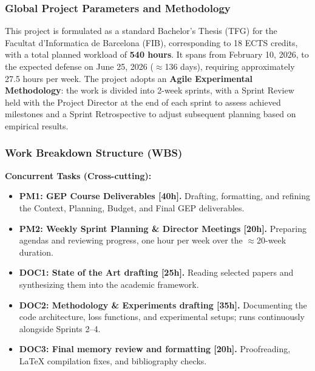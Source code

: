 \documentclass[11pt, a4paper]{article}
\begin{document}
\subsubsection*{Global Project Parameters and Methodology}
This project is formulated as a standard Bachelor's Thesis (TFG) for the Facultat d'Informatica de Barcelona (FIB), corresponding to 18 ECTS credits, with a total planned workload of \textbf{540 hours}. It spans from February 10, 2026, to the expected defense on June 25, 2026 ($\approx$136 days), requiring approximately 27.5 hours per week. The project adopts an \textbf{Agile Experimental Methodology}: the work is divided into 2-week sprints, with a Sprint Review held with the Project Director at the end of each sprint to assess achieved milestones and a Sprint Retrospective to adjust subsequent planning based on empirical results.

\subsubsection*{Work Breakdown Structure (WBS)}

\textbf{Concurrent Tasks (Cross-cutting):}
\begin{itemize}
    \item \textbf{PM1: GEP Course Deliverables [40h].} Drafting, formatting, and refining the Context, Planning, Budget, and Final GEP deliverables.
    \item \textbf{PM2: Weekly Sprint Planning \& Director Meetings [20h].} Preparing agendas and reviewing progress, one hour per week over the $\approx$20-week duration.
    \item \textbf{DOC1: State of the Art drafting [25h].} Reading selected papers and synthesizing them into the academic framework.
    \item \textbf{DOC2: Methodology \& Experiments drafting [35h].} Documenting the code architecture, loss functions, and experimental setups; runs continuously alongside Sprints 2--4.
    \item \textbf{DOC3: Final memory review and formatting [20h].} Proofreading, LaTeX compilation fixes, and bibliography checks.
\end{itemize}
\end{document}

